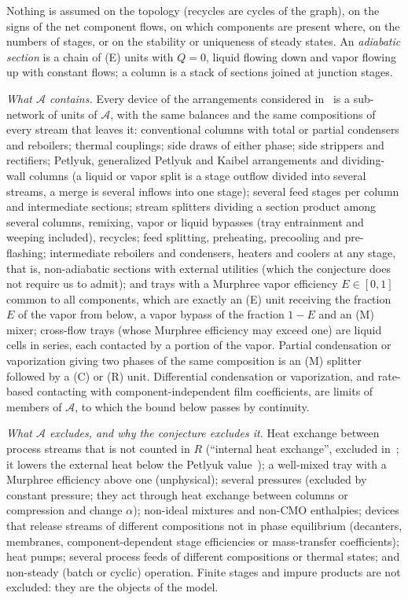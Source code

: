 \documentclass[11pt,a4paper]{report}
\newcommand{\cA}{\mathcal A}
\begin{document}
Nothing is assumed on the topology (recycles are cycles of the graph), on the signs of the net component flows, on which
components are present where, on the numbers of stages, or on the stability or uniqueness of steady states. An
\emph{adiabatic section} is a chain of (E) units with \(Q=0\), liquid flowing down and vapor flowing up with constant flows;
a column is a stack of sections joined at junction stages.

\emph{What \(\cA\) contains.} Every device of the arrangements considered
in~\autocite{HS3,HalvorsenThesis,Agrawal2003,Fidkowski2006,SA10,TGAT,CSL97} is a sub-network of units of \(\cA\), with
the same balances and the same compositions of every stream that leaves it: conventional columns with total or partial
condensers and reboilers; thermal couplings; side draws of either phase; side strippers and rectifiers; Petlyuk,
generalized Petlyuk and Kaibel arrangements and dividing-wall columns (a liquid or vapor split is a stage outflow divided
into several streams, a merge is several inflows into one stage); several feed stages per column and intermediate
sections; stream splitters dividing a section product among several columns, remixing, vapor or liquid bypasses (tray
entrainment and weeping included), recycles; feed splitting, preheating, precooling and pre-flashing; intermediate
reboilers and condensers, heaters and coolers at any stage, that is, non-adiabatic sections with external utilities
(which the conjecture does not require us to admit); and trays with a Murphree vapor efficiency \(E\in[0,1]\) common to all
components, which are exactly an (E) unit receiving the fraction \(E\) of the vapor from below, a vapor bypass of the
fraction \(1-E\) and an (M) mixer; cross-flow trays (whose Murphree efficiency may exceed one) are liquid cells in series,
each contacted by a portion of the vapor. Partial condensation or vaporization giving two phases of the same composition
is an (M) splitter followed by a (C) or (R) unit. Differential condensation or vaporization, and rate-based contacting with
component-independent film coefficients, are limits of members of \(\cA\), to which the bound below passes by continuity.

\emph{What \(\cA\) excludes, and why the conjecture excludes it.} Heat exchange between process streams that is not counted
in \(R\) (``internal heat exchange'', excluded in~\autocite[\S6.3, \S8]{HS3}; it lowers the external heat below the
Petlyuk value~\autocite[Table~6.1]{HalvorsenThesis}); a well-mixed tray with a Murphree efficiency above one (unphysical);
several pressures (excluded by constant pressure; they act through
heat exchange between columns or compression and change \(\alpha\)); non-ideal mixtures and non-CMO enthalpies; devices that
release streams of different compositions not in phase equilibrium (decanters, membranes, component-dependent stage
efficiencies or mass-transfer coefficients); heat pumps; several process feeds of different compositions or thermal
states; and non-steady (batch or cyclic) operation. Finite stages and impure products are not excluded: they are the
objects of the model.
\end{document}

